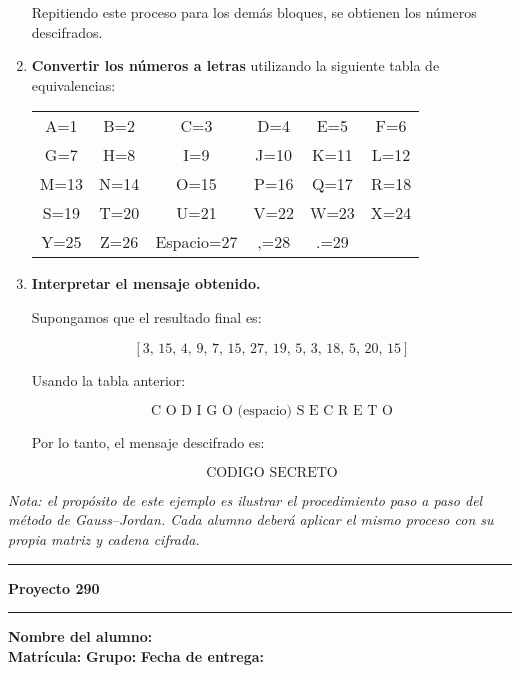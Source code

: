 \documentclass{article}%
\begin{document}
\begin{enumerate}
    Repitiendo este proceso para los demás bloques, se obtienen los números descifrados.

    \item \textbf{Convertir los números a letras} utilizando la siguiente tabla de equivalencias:

    \begin{center}
    \renewcommand{\arraystretch}{1.2}
    \small
    \begin{tabular}{cccccc}
    A=1 & B=2 & C=3 & D=4 & E=5 & F=6 \\
    G=7 & H=8 & I=9 & J=10 & K=11 & L=12 \\
    M=13 & N=14 & O=15 & P=16 & Q=17 & R=18 \\
    S=19 & T=20 & U=21 & V=22 & W=23 & X=24 \\
    Y=25 & Z=26 & Espacio=27 & ,=28 & .=29 &
    \end{tabular}
    \end{center}

    \item \textbf{Interpretar el mensaje obtenido.}

    Supongamos que el resultado final es:

    \[
    [3,\, 15,\, 4,\, 9,\, 7,\, 15,\, 27,\, 19,\, 5,\, 3,\, 18,\, 5,\, 20,\, 15]
    \]

    Usando la tabla anterior:

    \[
    \text{C O D I G O (espacio) S E C R E T O}
    \]

    Por lo tanto, el mensaje descifrado es:

    \[
    \boxed{\text{CODIGO SECRETO}}
    \]
\end{enumerate}

\bigskip
\textit{Nota: el propósito de este ejemplo es ilustrar el procedimiento paso a paso del método de Gauss–Jordan.
Cada alumno deberá aplicar el mismo proceso con su propia matriz y cadena cifrada.}

\bigskip
\hrule
\bigskip%

\newpage
\vspace{0.5em}
\noindent\textbf{Proyecto 290}\\%
\noindent\hrule
\vspace{1em}

\noindent\textbf{Nombre del alumno:} \underline{\hspace{11.8cm}}\\[8pt]
\noindent\textbf{Matrícula:} \underline{\hspace{4cm}} 
\textbf{Grupo:} \underline{\hspace{1.9cm}}
\textbf{Fecha de entrega:} \underline{\hspace{2.5cm}}\\[12pt]
\end{document}

